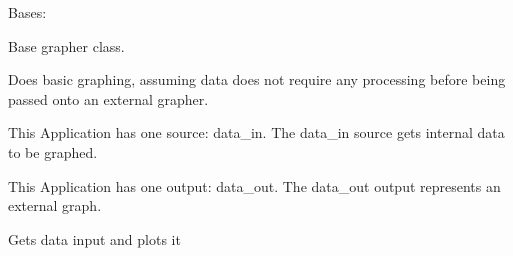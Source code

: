 \documentclass[letterpaper,10pt,english]{sphinxmanual}
\begin{document}
\begin{fulllineitems}
\label{\detokenize{dalio.application:dalio.application.graphers.Grapher}}
Bases: {\hyperref[\detokenize{dalio.application:dalio.application.application.Application}]{}}

Base grapher class.

Does basic graphing, assuming data does not require any processing before
being passed onto an external grapher.

This Application has one source: data\_in. The data\_in source gets
internal data to be graphed.

This Application has one output: data\_out. The data\_out output represents
an external graph.

\begin{fulllineitems}
\label{\detokenize{dalio.application:dalio.application.graphers.Grapher.run}}
Gets data input and plots it

\end{fulllineitems}


\end{fulllineitems}

\end{document}
